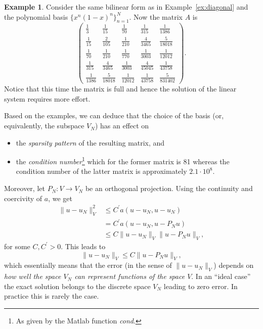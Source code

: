 \documentclass{amsart}
\theoremstyle{definition}
\newtheorem{example}{Example}
\begin{document}
\begin{example}
  Consider the same bilinear form as in Example~\ref{ex:diagonal}
  and the polynomial basis $\{x^n(1-x)^n\}_{n=1}^N$. Now the matrix $A$ is
  \begin{equation}
    \left(\begin{array}{ccccc} \frac{1}{3} & \frac{1}{15} & \frac{1}{70} & \frac{1}{315} & \frac{1}{1386}\\ \frac{1}{15} & \frac{2}{105} & \frac{1}{210} & \frac{4}{3465} & \frac{5}{18018}\\ \frac{1}{70} & \frac{1}{210} & \frac{1}{770} & \frac{1}{3003} & \frac{1}{12012}\\ \frac{1}{315} & \frac{4}{3465} & \frac{1}{3003} & \frac{4}{45045} & \frac{1}{43758}\\ \frac{1}{1386} & \frac{5}{18018} & \frac{1}{12012} & \frac{1}{43758} & \frac{5}{831402} \end{array}\right).
  \end{equation}
  Notice that this time the matrix is full and hence the solution of
the linear system requires more effort.
\end{example}

Based on the examples, we can deduce that the choice of the basis (or,
equivalently, the subspace $V_N$) has an effect on
\begin{itemize}
  \item the \emph{sparsity
    pattern} of the resulting matrix, and
    \item the \emph{condition
number}\footnote{As given by the Matlab function \emph{cond}.} which for the
former matrix is 81 whereas the condition number of the latter matrix
is approximately $2.1 \cdot 10^8$.
\end{itemize}
Moreover, let $P_N : V \rightarrow V_N$ be an orthogonal
projection. Using the continuity and coercivity of $a$, we get
\begin{align*}
  \|u-u_N\|_V^2 &\leq C^\prime a(u-u_N,u-u_N) \\
                &= C^\prime a(u-u_N,u-P_N u) \\
  &\leq C \|u-u_N\|_V \|u-P_N u\|_V,
\end{align*}
for some $C, C^\prime >0$. This leads to
\begin{equation}
  \|u-u_N\|_V \leq C \|u-P_N u\|_V,
\end{equation}
which essentially means that the error (in the sense of $\|u-u_N\|_V$)
depends on \emph{how well the space $V_N$ can represent functions of
the space $V$}. In an ``ideal case'' the exact solution belongs to the
discrete space $V_N$ leading to zero error. In practice this is rarely
the case.
\end{document}
